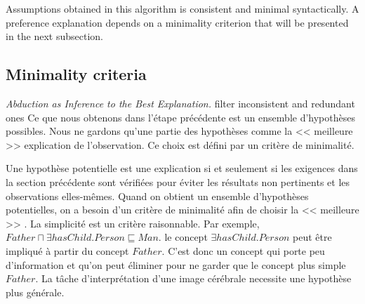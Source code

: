 \documentclass{article}
\newtheorem{mydef}{Definition}
\begin{document}
Assumptions obtained in this algorithm is consistent and minimal syntactically. 
A preference explanation depends on a minimality criterion that will be presented in the next subsection.


\subsection{Minimality criteria}
\textit{Abduction as Inference to the Best Explanation.}
filter inconsistent and redundant ones
Ce que nous obtenons dans l'étape précédente est un ensemble d'hypothèses possibles. Nous ne gardons qu'une partie des hypothèses comme la << meilleure >> explication de l'observation.
Ce choix est défini par un critère de minimalité.


Une hypothèse potentielle est une explication si et seulement si les exigences dans la section précédente sont vérifiées pour éviter les résultats non pertinents et les observations elles-mêmes.
Quand on obtient un ensemble d'hypothèses potentielles, on a besoin
d'un critère de minimalité afin de choisir la << meilleure >> \cite{aliseda1997seeking}.
La simplicité est un critère raisonnable.
Par exemple, $Father \sqcap \exists hasChild.Person \sqsubseteq Man$. le concept $\exists hasChild.Person$ peut être impliqué
à partir du concept $Father$. C'est donc un concept qui porte peu d'information et qu'on peut éliminer pour ne garder que le concept plus simple $Father$. 
La tâche d'interprétation d'une image cérébrale necessite une hypothèse plus générale.

\end{document}
